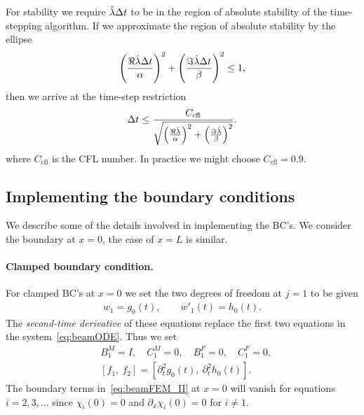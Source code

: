\documentclass[11pt]{article}
\newcommand{\dt}{{\Delta t}}
\begin{document}
For stability we require $\lambdaHat\dt$ to be in the region of absolute stability of the time-stepping
algorithm.
If we approximate the region of absolute stability by the ellipse
\begin{align*}
   \left(\frac{\Re\lambdaHat\dt}{\alpha}\right)^2  + \left(\frac{\Im\lambdaHat\dt}{\beta}\right)^2 \le 1,
\end{align*}
then we arrive at the time-step restriction
\begin{align*}
   \dt \le \frac{C_\text{cfl}}{\sqrt{ \left(\frac{\Re\lambdaHat}{\alpha}\right)^2  + \left(\frac{\Im\lambdaHat}{\beta}\right)^2}}. 
\end{align*}
where $C_\text{cfl}$ is the CFL number. In practice we might choose $C_\text{cfl}=0.9$. 
\subsection{Implementing the boundary conditions} \label{eq:BeamModel_FEM_BC}

We describe some of the details involved in implementing the BC's. We consider the 
boundary at $x=0$, the case of $x=L$ is similar. 

\paragraph{Clamped boundary condition.} For clamped BC's at $x=0$ we set the two degrees of
freedom at $j=1$ to be given
\begin{align}
  w_1 = g_0(t), \qquad w'_1(t)=h_0(t).
\end{align}
The {\em second-time derivative} of these equations replace the first two equations in the system~\eqref{eq:beamODE}. 
Thus we set 
\begin{align*}
&  B_1^M=I, \quad C_1^M=0, \quad B^F_1=0, \quad C^F_1=0 , \\
&  [f_1, ~f_2]=[\partial_t^2g_0(t), ~\partial_t^2 h_0(t)].
\end{align*}
The boundary terms in~\eqref{eq:beamFEM_II} at $x=0$ will vanish for equations $i=2,3,\ldots$ 
since $\chi_i(0)=0$ and $\partial_x\chi_i(0)=0$
for $i\ne 1$.
\end{document}
